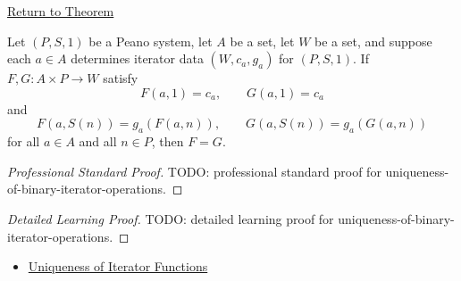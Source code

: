 \newpage
{}
\label{prf:uniqueness-of-binary-iterator-operations}

\begin{remark*}[Return]
\hyperref[cor:uniqueness-of-binary-iterator-operations]{Return to Theorem}
\end{remark*}

\begin{corollary*}
Let $(P,S,1)$ be a Peano system, let $A$ be a set, let $W$ be a set, and
suppose each $a\in A$ determines iterator data $(W,c_a,g_a)$ for $(P,S,1)$.
If $F,G:A\times P\to W$ satisfy
\[
F(a,1)=c_a,\qquad G(a,1)=c_a
\]
and
\[
F(a,S(n))=g_a(F(a,n)),
\qquad
G(a,S(n))=g_a(G(a,n))
\]
for all $a\in A$ and all $n\in P$, then $F=G$.
\end{corollary*}

\begin{proof}[Professional Standard Proof]
\LRAProofBodyStart
TODO: professional standard proof for uniqueness-of-binary-iterator-operations.
\end{proof}

\begin{proof}[Detailed Learning Proof]
\LRAProofBodyStart
TODO: detailed learning proof for uniqueness-of-binary-iterator-operations.
\end{proof}

\begin{remark*}
\end{remark*}

\begin{dependencies}
\begin{itemize}
  \item \hyperref[lem:uniqueness-of-iterator-functions]{Uniqueness of Iterator Functions}
\end{itemize}
\end{dependencies}

\clearpage
